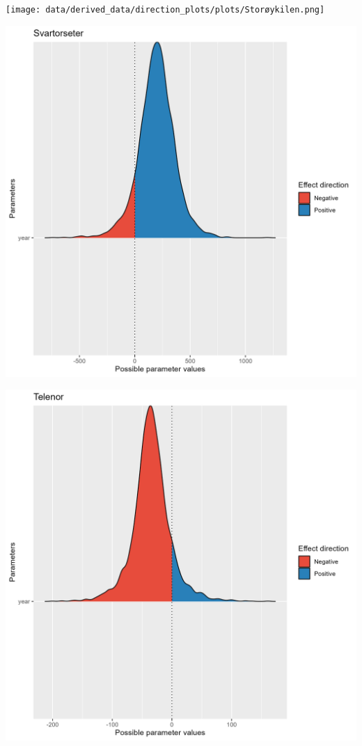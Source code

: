 \documentclass[
  letterpaper,
  DIV=11,
  numbers=noendperiod]{scrreport}
\begin{document}
\texttt{[image: data/derived\_data/direction\_plots/plots/Storøykilen.png]}

\includegraphics{data/derived_data/direction_plots/plots/Svartorseter.png}

\includegraphics{data/derived_data/direction_plots/plots/Telenor.png}
\end{document}
